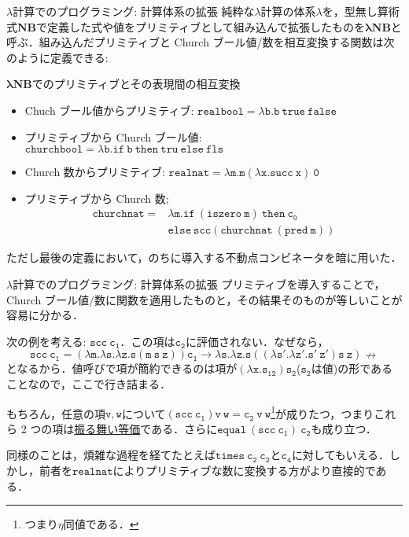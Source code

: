 \documentclass[9pt]{beamer}
\begin{document}
\begin{frame}{$\lambda$計算でのプログラミング: 計算体系の拡張}
純粋な$\lambda$計算の体系$\lambda$を，型無し算術式$\mathbf{NB}$で定義した式や値をプリミティブとして組み込んで拡張したものを$\mathbf{\lambda NB}$と呼ぶ．組み込んだプリミティブと Church ブール値/数を相互変換する関数は次のように定義できる:

\begin{dblock}{$\mathbf{\lambda NB}$でのプリミティブとその表現間の相互変換}
	\begin{itemize}
		\item Chuch ブール値からプリミティブ: $\mathtt{realbool = \lambda b. b\ true\ false}$
		\item プリミティブから Church ブール値: $\mathtt{churchbool = \lambda b. if\ b\ then\ tru\ else\ fls}$
		\item Church 数からプリミティブ: $\mathtt{realnat = \lambda m. m(\lambda x. succ\ x)\ 0}$
		\item プリミティブから Church 数;\begin{align*}\mathtt{churchnat} = &\mathtt{\lambda m. if\ (iszero\ m)\ then\ c_{0}}\\
			&\mathtt{else\ scc(churchnat\ (pred\ m))}\end{align*}
	\end{itemize}
	ただし最後の定義において，のちに導入する不動点コンビネータを暗に用いた．
\end{dblock}
\end{frame}
\begin{frame}{$\lambda$計算でのプログラミング: 計算体系の拡張}
	プリミティブを導入することで，Church ブール値/数に関数を適用したものと，その結果そのものが等しいことが容易に分かる．

次の例を考える: $\mathtt{scc\ c_{1}}$．この項は$\mathtt{c_{2}}$に評価されない．なぜなら，\begin{equation*}
	\mathtt{scc\ c_{1}} = \mathtt{(\lambda m. \lambda s. \lambda z. s (m\ s\ z))c_{1}}\rightarrow \mathtt{\lambda s. \lambda z. s((\lambda s'.\lambda z'. s'\ z')s\ z)}\nrightarrow
\end{equation*}
となるから．値呼びで項が簡約できるのは項が$\mathtt{(\lambda x. s_{12})s_{2}}$($\mathtt{s_{2}}$は値)の形であることなので，ここで行き詰まる．

もちろん，任意の項$\mathtt{v, w}$について$\mathtt{(scc\ c_{1})v\ w = c_{2}\ v\ w}$\footnote{つまり$\eta$同値である．}が成りたつ，つまりこれら 2 つの項は\underline{振る舞い等価}である．さらに$\mathtt{equal\ (scc\ c_{1})\ c_{2}}$も成り立つ．

同様のことは，煩雑な過程を経てたとえば$\mathtt{times\ c_{2}\ c_{2}}$と$\mathtt{c_{4}}$に対してもいえる．しかし，前者を$\mathtt{realnat}$によりプリミティブな数に変換する方がより直接的である．
\end{frame}
\end{document}
